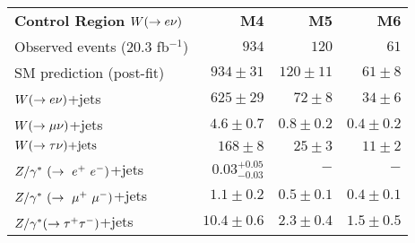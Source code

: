 \begin{table}[!ht]
\begin{center}
\begin{small}
\begin{tabular*}{\textwidth}{@{\extracolsep{\fill}}lrrr}
    
    \hline \hline
                 & & & \\                                                          
    \hline 
                                                                         
{\bf  Control Region} $W(\rightarrow e \nu)$  & \textbf{M4} & \textbf{M5} & \textbf{M6}  \\
    Observed events  (20.3 fb${}^{-1}$)& $934$                 & $120$        &  $61$             \\ \hline
                                                                                                
    SM prediction (post-fit)                     & $934 \pm 31$          & $120 \pm 11$ &  $61 \pm 8$     \\ \hline
                                                                                                
    $W(\rightarrow e \nu)$+jets                             & $625 \pm 29$          & $72 \pm 8$   &  $34 \pm 6$     \\
                                                                                                
    $W(\rightarrow \mu \nu)$+jets                             & $4.6 \pm 0.7$         & $0.8 \pm 0.2$&  $0.4 \pm 0.2$  \\
                                                                                                
    $W(\rightarrow \tau \nu)\text{+jets}$                             & $168 \pm 8$           & $25 \pm 3$   &  $11 \pm 2$     \\
                                                                                                
    $Z/\gamma^*~(\rightarrow~e^+~e^-)$+jets                             & $0.03_{-0.03}^{+0.05}$& $-$         &  $-$           \\
                                                                                                
    $Z/\gamma^*~(\rightarrow~\mu^+~\mu^-)$+jets                             & $1.1 \pm 0.2$         & $0.5 \pm 0.1$&  $0.4 \pm 0.1$  \\
                                                                                                
    $Z/\gamma^*(\rightarrow \tau^+ \tau^-)$+jets                             & $10.4 \pm 0.6$        & $2.3 \pm 0.4$&  $1.5 \pm 0.5$  \\
                                                                                                

\end{tabular*}
\end{small}
\end{center}
\end{table}
